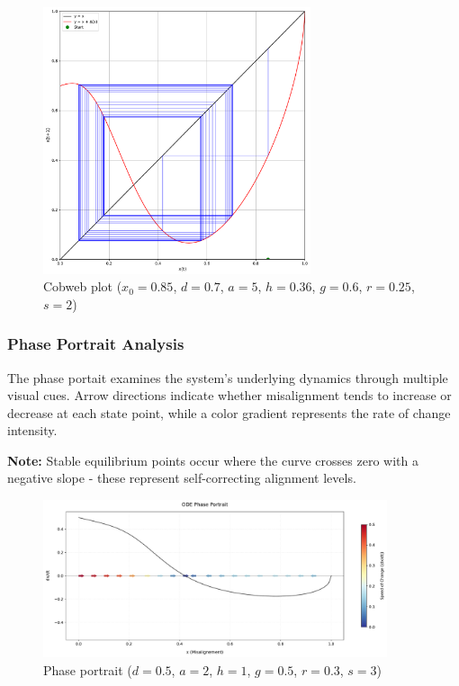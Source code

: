 \documentclass[a4paper, 10pt]{article}
\begin{document}
\begin{figure}[H]
	\centering
	\includegraphics[width=0.7\textwidth]{../images/results/cobweb.pdf}
	\caption{Cobweb plot ($x_0 = 0.85$, $d = 0.7$, $a = 5$, $h = 0.36$, $g = 0.6$, $r = 0.25$, $s = 2$)} %
	\label{fig:cobweb_plot}
\end{figure}

\subsubsection{Phase Portrait Analysis}
The phase portait examines the system's underlying dynamics through multiple visual cues. Arrow directions indicate whether misalignment tends to increase or decrease at each state point, while a color gradient represents the rate of change intensity.

\textbf{Note:} Stable equilibrium points occur where the curve crosses zero with a negative slope - these represent self-correcting alignment levels.

\begin{figure}[H]
	\centering
	\includegraphics[width=0.9\textwidth]{../images/results/phase-portrait.pdf}
	\caption{Phase portrait ($d = 0.5$, $a = 2$, $h = 1$, $g = 0.5$, $r = 0.3$, $s = 3$)}
	\label{fig:phase_portrait}
\end{figure}
\end{document}
